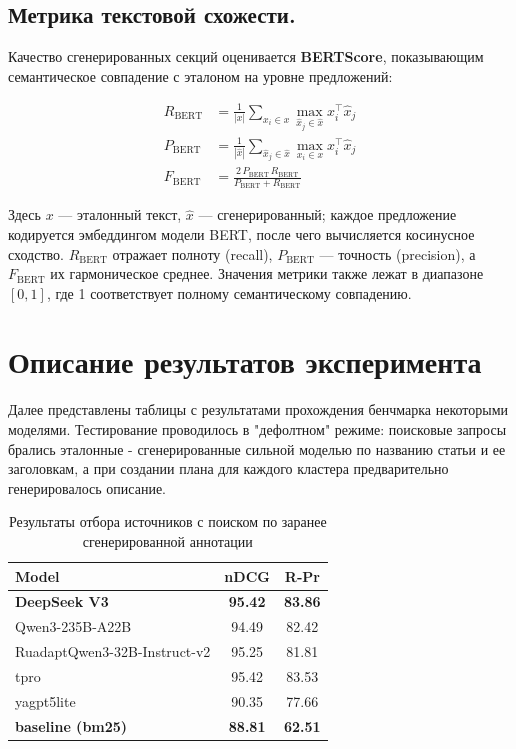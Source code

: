 \documentclass{article}
\theoremstyle{definition}
\theoremstyle{plain}
\begin{document}
\subsection*{Метрика текстовой схожести.}

Качество сгенерированных секций оценивается \textbf{BERTScore}, показывающим семантическое совпадение с эталоном на уровне предложений:

\begin{align}
R_{\mathrm{BERT}} &= \frac{1}{|x|}\sum_{x_i\in x}\max_{\hat{x}_j\in\hat{x}} x_i^\top \hat{x}_j\tag{7}\\
P_{\mathrm{BERT}} &= \frac{1}{|\hat{x}|}\sum_{\hat{x}_j\in\hat{x}}\max_{x_i\in x} x_i^\top \hat{x}_j\tag{8}\\
F_{\mathrm{BERT}} &= \frac{2\,P_{\mathrm{BERT}}\,R_{\mathrm{BERT}}}{P_{\mathrm{BERT}} + R_{\mathrm{BERT}}}\tag{9}
\end{align}

Здесь \(x\) — эталонный текст, \(\hat{x}\) — сгенерированный; каждое предложение кодируется эмбеддингом модели BERT, после чего вычисляется косинусное сходство.  
\(R_{\mathrm{BERT}}\) отражает полноту (recall), \(P_{\mathrm{BERT}}\) — точность (precision), а \(F_{\mathrm{BERT}}\) их гармоническое среднее.  
Значения метрики также лежат в диапазоне \([0,1]\), где 1 соответствует полному семантическому совпадению.


\section*{Описание результатов эксперимента}
Далее представлены таблицы с результатами прохождения бенчмарка некоторыми моделями. Тестирование проводилось в "дефолтном" режиме: поисковые запросы брались эталонные - сгенерированные сильной моделью по названию статьи и ее заголовкам, а
при создании плана для каждого кластера предварительно генерировалось описание.

\begin{table}[ht]
\centering
\caption{Результаты отбора источников с поиском по заранее сгенерированной аннотации}
\begin{tabular}{l|c|c}
\hline
\textbf{Model} & \textbf{nDCG} & \textbf{R‑Pr} \\
\hline
\textbf{DeepSeek V3} & \textbf{95.42} & \textbf{83.86} \\
Qwen3-235B-A22B & 94.49 & 82.42 \\
RuadaptQwen3-32B-Instruct-v2 & 95.25 & 81.81 \\
tpro & 95.42 & 83.53 \\
yagpt5lite & 90.35 & 77.66 \\
\textbf{baseline (bm25)} & \textbf{88.81} & \textbf{62.51} \\
\hline
\end{tabular}
\end{table}
\end{document}
